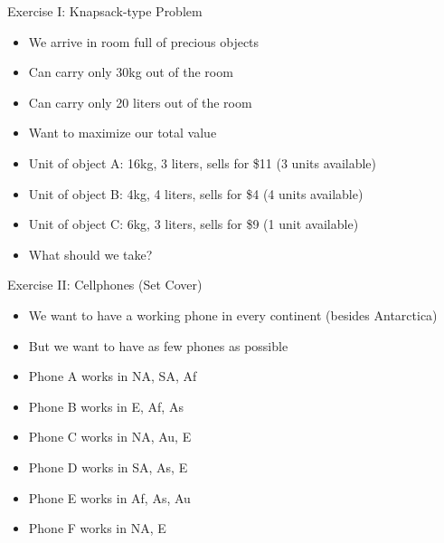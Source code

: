 \documentclass[11pt,aspectratio=169]{beamer}
\begin{document}
  \begin{frame}{Exercise I: Knapsack-type Problem}
   \begin{itemize}
    \item We arrive in room full of precious objects
    \item Can carry only 30kg out of the room
    \item Can carry only 20 liters out of the room
    \item Want to maximize our total value
    \item Unit of object A: 16kg, 3 liters, sells for \$11 (3 units available)
    \item Unit of object B: 4kg, 4 liters, sells for \$4 (4 units available)
    \item Unit of object C: 6kg, 3 liters, sells for \$9 (1 unit available)
    \item What should we take?
   \end{itemize}
  \end{frame}
 
  \begin{frame}{Exercise II: Cellphones (Set Cover)}
   \begin{itemize}
    \item We want to have a working phone in every continent (besides Antarctica) 
    \item But we want to have as few phones as possible
    \item Phone A works in NA, SA, Af
    \item Phone B works in E, Af, As
    \item Phone C works in NA, Au, E
    \item Phone D works in SA, As, E
    \item Phone E works in Af, As, Au
    \item Phone F works in NA, E
   \end{itemize}
  \end{frame}
 
\end{document}

